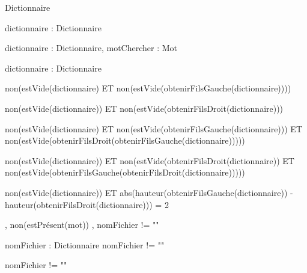 \begin{algorithme}
		{}%
		{Dictionnaire}
	
		{dictionnaire : Dictionnaire}%
		{\booleen}
	
		{dictionnaire : Dictionnaire, motChercher : Mot}%
		{\booleen}

		{dictionnaire : Dictionnaire}%
		{\entier}

		{}%
		{non(estVide(dictionnaire) ET non(estVide(obtenirFilsGauche(dictionnaire))))}

		{}%
		{non(estVide(dictionnaire)) ET non(estVide(obtenirFilsDroit(dictionnaire)))}

		{}
		{non(estVide(dictionnaire) ET non(estVide(obtenirFilsGauche(dictionnaire))) ET non(estVide(obtenirFilsDroit(obtenirFilsGauche(dictionnaire)))))}
	
		{}%
		{non(estVide(dictionnaire)) ET non(estVide(obtenirFilsDroit(dictionnaire)) ET non(estVide(obtenirFilsGauche(obtenirFilsDroit(dictionnaire)))))}

		{}%
		{non(estVide(dictionnaire)) ET abs(hauteur(obtenirFilsGauche(dictionnaire)) - hauteur(obtenirFilsDroit(dictionnaire))) = 2}

		{,}
		{non(estPrésent(mot))}
		{, }%
		{nomFichier != ""}

		{nomFichier : \chaine}
		{Dictionnaire}
		{nomFichier != ""}

		{}%
		{nomFichier != ""}

	
\end{algorithme}
